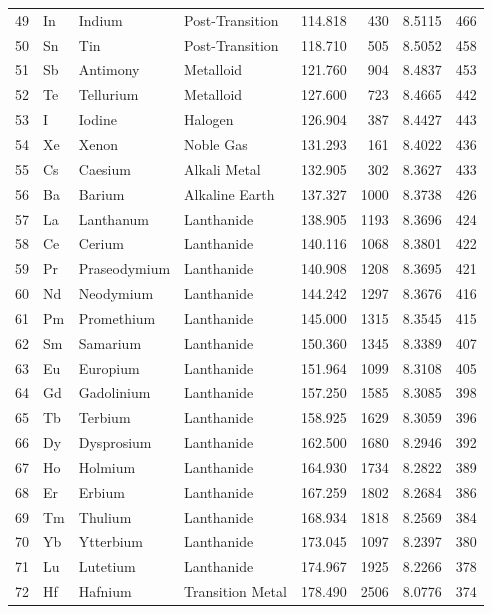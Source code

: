 \documentclass[11pt,a4paper]{article}
\begin{document}
\begin{longtable}{rlllrrrr}
  49 & In & Indium & Post-Transition & 114.818 & 430 & 8.5115 & 466 \\
  50 & Sn & Tin & Post-Transition & 118.710 & 505 & 8.5052 & 458 \\
  51 & Sb & Antimony & Metalloid & 121.760 & 904 & 8.4837 & 453 \\
  52 & Te & Tellurium & Metalloid & 127.600 & 723 & 8.4665 & 442 \\
  53 & I & Iodine & Halogen & 126.904 & 387 & 8.4427 & 443 \\
  54 & Xe & Xenon & Noble Gas & 131.293 & 161 & 8.4022 & 436 \\
  55 & Cs & Caesium & Alkali Metal & 132.905 & 302 & 8.3627 & 433 \\
  56 & Ba & Barium & Alkaline Earth & 137.327 & 1000 & 8.3738 & 426 \\
  57 & La & Lanthanum & Lanthanide & 138.905 & 1193 & 8.3696 & 424 \\
  58 & Ce & Cerium & Lanthanide & 140.116 & 1068 & 8.3801 & 422 \\
  59 & Pr & Praseodymium & Lanthanide & 140.908 & 1208 & 8.3695 & 421 \\
  60 & Nd & Neodymium & Lanthanide & 144.242 & 1297 & 8.3676 & 416 \\
  61 & Pm & Promethium & Lanthanide & 145.000 & 1315 & 8.3545 & 415 \\
  62 & Sm & Samarium & Lanthanide & 150.360 & 1345 & 8.3389 & 407 \\
  63 & Eu & Europium & Lanthanide & 151.964 & 1099 & 8.3108 & 405 \\
  64 & Gd & Gadolinium & Lanthanide & 157.250 & 1585 & 8.3085 & 398 \\
  65 & Tb & Terbium & Lanthanide & 158.925 & 1629 & 8.3059 & 396 \\
  66 & Dy & Dysprosium & Lanthanide & 162.500 & 1680 & 8.2946 & 392 \\
  67 & Ho & Holmium & Lanthanide & 164.930 & 1734 & 8.2822 & 389 \\
  68 & Er & Erbium & Lanthanide & 167.259 & 1802 & 8.2684 & 386 \\
  69 & Tm & Thulium & Lanthanide & 168.934 & 1818 & 8.2569 & 384 \\
  70 & Yb & Ytterbium & Lanthanide & 173.045 & 1097 & 8.2397 & 380 \\
  71 & Lu & Lutetium & Lanthanide & 174.967 & 1925 & 8.2266 & 378 \\
  72 & Hf & Hafnium & Transition Metal & 178.490 & 2506 & 8.0776 & 374 \\

\end{longtable}
\end{document}
